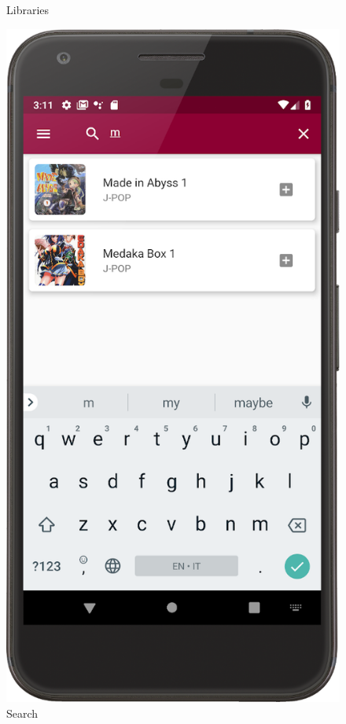 \begin{figure}[!htb]
\begin{minipage}[b]{0.3\textwidth}
        \caption{Libraries}
        \label{ref:librariespage}
    \end{minipage}
    \hfill
    \begin{minipage}[b]{0.3\textwidth}
        \includegraphics[scale=1]{images/search-page.png}
        \caption{Search}
        \label{ref:search}
    \end{minipage}
\end{figure}
